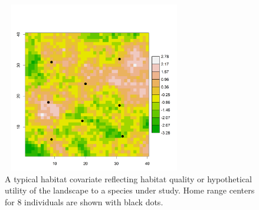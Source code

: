 \begin{figure}[ht]
\centering
\includegraphics[width=3.15in,height=2.93in]{Ch13-RSF/figs/habitat.png}
\caption{A typical habitat covariate reflecting habitat quality or
  hypothetical utility of the landscape to a species under study. Home
  range centers for 8 individuals are shown with black dots.}
\label{rsf.fig.habitat}
\end{figure}


